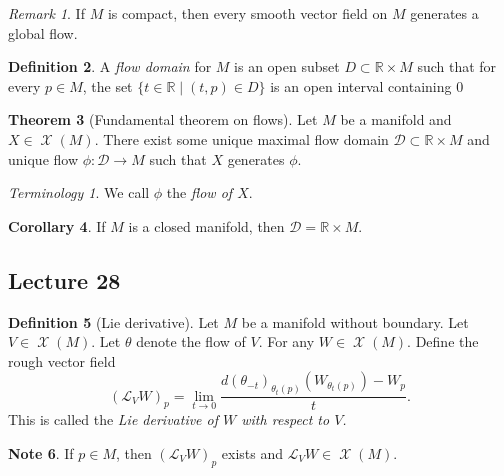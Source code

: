 \documentclass[10pt,letterpaper,cm]{nupset}
\theoremstyle{definition}
\newtheorem{definition}{Definition}[subsection]
\newtheorem{note}[definition]{Note}
\theoremstyle{theorem}
\newtheorem{theorem}[definition]{Theorem}
\newtheorem{corollary}[definition]{Corollary}
\theoremstyle{remark}
\newtheorem{remark}[definition]{Remark}
\newtheorem*{term}{Terminology}
\newcommand{\R}{\mathbb R}
\newcommand{\1}{\mathbf{1}}
\newcommand{\0}{\vec 0}
\DeclareMathOperator{\vf}{\mathscr{X}}
\begin{document}
\begin{remark}
If $M$ is compact, then every smooth vector field on $M$ generates a global flow.
\end{remark}

\begin{definition}
A \textit{flow domain} for $M$ is an open subset $D\subset \R \times M$ such that for every $p\in M$, the set $\{t\in \R \mid \left(t, p\right) \in D\}$ is an open interval containing $0$
\end{definition}

\begin{theorem}[Fundamental theorem on flows]
Let $M$ be a manifold and $X\in \vf(M)$. There exist some unique maximal flow domain $\mathcal{D}\subset \R \times M$ and unique flow $\phi: \mathcal{D}  \to M$ such that $X$ generates $\phi$.
\end{theorem}

\begin{term}
We call $\phi$ the \textit{flow of $X$}.
\end{term}

\begin{corollary}
If $M$ is a closed manifold, then $\mathcal{D} = \R \times M$.
\end{corollary}

\subsection{Lecture 28}

\begin{definition}[Lie derivative]
Let $M$ be a manifold without boundary. Let $V\in \vf(M)$. Let $\theta$ denote the flow of $V$. For any $W\in \vf(M)$. Define the rough vector field $$ (\mathcal{L}_VW)_p  = \lim_{t\to 0}\frac{d(\theta_{-t})_{\theta_t(p)}\left(W_{\theta_{t}(p)}\right)-W_p }{t}.$$ This is called the \textit{Lie derivative of $W$ with respect to $V$.}
\end{definition}

\begin{note}
If $p\in M$, then $(\mathcal{L}_VW)_p$ exists and $\mathcal{L}_VW \in \vf(M)$. 
\end{note}
\end{document}

